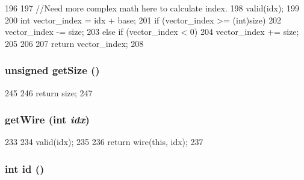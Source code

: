\begin{DoxyCode}
196     {
197         //Need more complex math here to calculate index.
198         valid(idx);
199 
200         int vector_index = idx + base;
201         if (vector_index >= (int)size) {
202             vector_index -= size;
203         } else if (vector_index < 0) {
204             vector_index += size;
205         }
206 
207         return vector_index;
208     }
\end{DoxyCode}
\hypertarget{classTimeBuffer_a28ce3e44c8a6c2d60bb4c4837356c3b4}{
\subsubsection[{getSize}]{\setlength{\rightskip}{0pt plus 5cm}unsigned getSize ()}}
\label{classTimeBuffer_a28ce3e44c8a6c2d60bb4c4837356c3b4}



\begin{DoxyCode}
245     {
246         return size;
247     }
\end{DoxyCode}
\hypertarget{classTimeBuffer_ab1c801fd9d022ce4339cc62f4a0625dd}{
\subsubsection[{getWire}]{ getWire (int {\em idx})}}
\label{classTimeBuffer_ab1c801fd9d022ce4339cc62f4a0625dd}



\begin{DoxyCode}
233     {
234         valid(idx);
235 
236         return wire(this, idx);
237     }
\end{DoxyCode}
\hypertarget{classTimeBuffer_a4a716406d3d9d4fdbbe46f100e648f3b}{
\subsubsection[{id}]{\setlength{\rightskip}{0pt plus 5cm}int id ()}}
\label{classTimeBuffer_a4a716406d3d9d4fdbbe46f100e648f3b}



